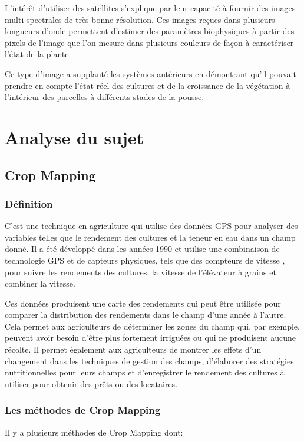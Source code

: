 \documentclass[12pt, openany]{report}
\begin{document}
L'intérêt d'utiliser des satellites s'explique par leur capacité à  fournir des images multi spectrales de très bonne résolution. Ces images reçues dans plusieurs longueurs d'onde permettent d'estimer des paramètres biophysiques à partir des pixels de l'image que l'on mesure dans plusieurs couleurs de façon à caractériser l'état de la plante.
\par
Ce type d'image a supplanté les systèmes antérieurs en démontrant qu'il pouvait prendre en compte l'état réel des cultures et de la croissance de la végétation à l'intérieur des parcelles à différents stades de la pousse.

\chapter{Analyse du sujet}
\section{Crop Mapping}
\subsection{Définition}
C’est une technique en agriculture qui utilise des données GPS pour analyser des variables telles que le rendement des cultures et la teneur en eau dans un champ donné. Il a été développé dans les années 1990 et utilise une combinaison de technologie GPS et de capteurs physiques, tels que des compteurs de vitesse , pour suivre les rendements des cultures, la vitesse de l'élévateur à grains et combiner la vitesse.
\par
Ces données produisent une carte des rendements qui peut être utilisée pour comparer la distribution des rendements dans le champ d'une année à l'autre. Cela permet aux agriculteurs de déterminer les zones du champ qui, par exemple, peuvent avoir besoin d'être plus fortement irriguées ou qui ne produisent aucune récolte. Il permet également aux agriculteurs de montrer les effets d'un changement dans les techniques de gestion des champs, d'élaborer des stratégies nutritionnelles pour leurs champs et d'enregistrer le rendement des cultures à utiliser pour obtenir des prêts ou des locataires.

\subsection{Les méthodes de Crop Mapping}

Il y a plusieurs méthodes de Crop Mapping dont:
\end{document}
